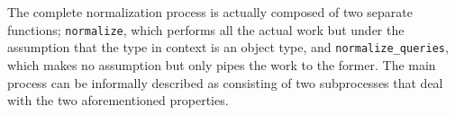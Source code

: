 The complete normalization process is actually composed of two separate functions; \texttt{normalize}, which performs all the actual work but under the assumption that the type in context is an object type, and \texttt{normalize\_queries}, which makes no assumption but only pipes the work  to the former. The main process can be informally described as consisting of two subprocesses that deal with the two aforementioned properties.
\iffalse
\begin{itemize}
    \item Grounding: Selections are either wrapped with inline fragments or lifted from an inline fragment.

    \item Merging: Fields with the same response name have their subqueries merged into a single selection.
    
    
\end{itemize}
\fi

